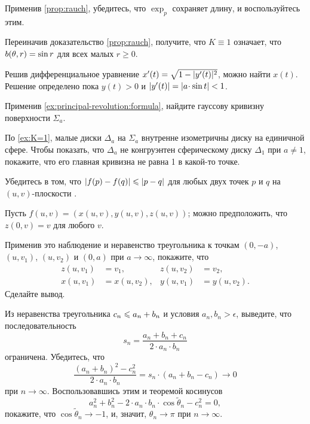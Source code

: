 \begin{multicols}{2}
Применив \ref{prop:rauch}, убедитесь, что $\exp_p$ сохраняет длину, и воспользуйтесь этим.

Переиначив доказательство \ref{prop:rauch}, получите, что $K\equiv 1$ означает, что $b(\theta,r)\z=\sin r$ для всех малых $r\ge 0$.

Решив дифференциальное уравнение $x'(t)\z=\sqrt{1-|y'(t)|^2}$, можно найти $x(t)$.
Решение определено пока $y(t)>0$ и $|y'(t)|\z=|a\cdot \sin t|<1$.

Применив \ref{ex:principal-revolution:formula}, найдите гауссову кривизну поверхности $\Sigma_a$.

По \ref{ex:K=1}, малые диски $\Delta_a$ на $\Sigma_a$ внутренне изометричны диску на единичной сфере.
Чтобы показать, что $\Delta_a$ не конгруэнтен сферическому диску $\Delta_1$ при $a\ne 1$, покажите, что его главная кривизна не равна 1 в какой-то точке.

Убедитесь в том, что $|f(p)-f(q)|\z\le |p-q|$ для любых двух точек $p$ и $q$ на $(u,v)$-плоскости .

Пусть $f(u,v)=(x(u,v),y(u,v),z(u,v))$;
можно предположить, что $z(0,v)=v$ для любого $v$.

Применив это наблюдение и неравенство треугольника к точкам $(0,-a)$, $(u,v_1)$, $(u,v_2)$ и $(0,a)$ при $a\to \infty$, покажите, что 
\begin{align*}
z(u,v_1)&=v_1,
&
z(u,v_2)&=v_2,
\\
x(u,v_1)&=x(u,v_2),
&
y(u,v_1)&=y(u,v_2).
\end{align*}
Сделайте вывод.



\setcounter{eqtn}{0}

Из неравенства треугольника $c_n\z\le a_n\z+b_n$ и условия $a_n,b_n>\epsilon$, выведите, что последовательность 
\[
s_n=\frac{a_n+b_n+c_n}{2\cdot a_n\cdot b_n}
\]
ограничена.
Убедитесь, что
\[
\frac{(a_n+b_n)^2-c_n^2}{2\cdot a_n\cdot b_n}=s_n\cdot (a_n+b_n-c_n)\to 0
\]
при $n\to\infty$.
Воспользовавшись этим и теоремой косинусов
\[
a_n^2+b_n^2-2\cdot a_n\cdot b_n\cdot\cos\tilde\theta_n -c_n^2=0,
\]
покажите, что $\cos\tilde\theta_n\to -1$, и, значит, $\theta_n\to \pi$ при $n\to\infty$.


\end{multicols}
